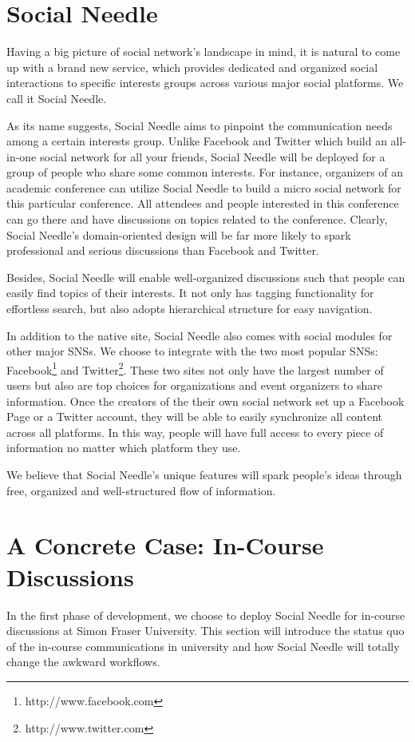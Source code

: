 \section{Social Needle}
Having a big picture of social network's landscape in mind, it is natural to come up with a brand new service, which provides dedicated and organized social interactions to specific interests groups across various major social platforms. We call it Social Needle. 

As its name suggests, Social Needle aims to pinpoint the communication needs among a certain interests group. Unlike Facebook and Twitter which build an all-in-one social network for all your friends, Social Needle will be deployed for a group of people who share some common interests. For instance, organizers of an academic conference can utilize Social Needle to build a micro social network for this particular conference. All attendees and people interested in this conference can go there and have discussions on topics related to the conference. Clearly, Social Needle's domain-oriented design will be far more likely to spark professional and serious discussions than Facebook and Twitter. 

Besides, Social Needle will enable well-organized discussions such that people can easily find topics of their interests. It not only has tagging functionality for effortless search, but also adopts hierarchical structure for easy navigation. 

In addition to the native site, Social Needle also comes with social modules for other major SNSs. We choose to integrate with the two most popular SNSs: Facebook\footnote{http://www.facebook.com} and Twitter\footnote{http://www.twitter.com}. These two sites not only have the largest number of users but also are top choices for organizations and event organizers to share information. Once the creators of the their own social network set up a Facebook Page or a Twitter account, they will be able to easily synchronize all content across all platforms. In this way, people will have full access to every piece of information no matter which platform they use. 

We believe that Social Needle's unique features will spark people's ideas through free, organized and well-structured flow of information. 

\section{A Concrete Case: In-Course Discussions}
In the first phase of development, we choose to deploy Social Needle for in-course discussions at Simon Fraser University. This section will introduce the status quo of the in-course communications in university and how Social Needle will totally change the awkward workflows. 

